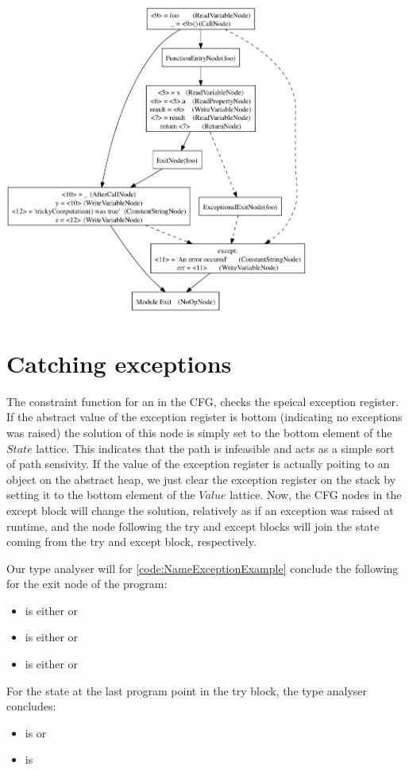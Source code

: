 \begin{listing}[H]
	\begin{center}
		\includegraphics[width=0.75\textwidth]{images/exception1.png}
	\end{center}
	\vspace{-10pt}
\end{listing}


\section{Catching exceptions}
The constraint function for an  in the CFG, checks the speical exception register. If the abstract value of the exception register is bottom (indicating no exceptions was raised) the solution of this node is simply set to the bottom element of the $State$ lattice. This indicates that the path is infeasible and acts as a simple sort of path sensivity. If the value of the exception register is actually poiting to an object on the abstract heap, we just clear the exception register on the stack by setting it to the bottom element of the $Value$ lattice. Now, the CFG nodes in the except block will change the solution, relatively as if an exception was raised at runtime, and the node following the try and except blocks will join the state coming from the try and except block, respectively.

Our type analyser will for \autoref{code:NameExceptionExample} conclude the following for the exit node of the program:

\begin{itemize}
	\item {} is either  or 
	\item {} is either  or 
	\item {} is either  or 
\end{itemize}

For the state at the last program point in the try block, the type analyser concludes:

\begin{itemize}
	\item {} is  or 
	\item {} is 
\end{itemize}
